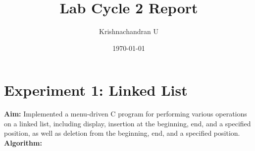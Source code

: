 \documentclass{article}
\title{Lab Cycle 2 Report}
\author{Krishnachandran U}
\date{\today}
\begin{document}
\maketitle

\tableofcontents %

\clearpage
{}
\section{Experiment 1: Linked List}
\textbf{Aim:} Implemented a menu-driven C program for performing various operations on a linked list, including display, insertion at the beginning, end, and a specified position, as well as deletion from the beginning, end, and a specified position.
\\
\textbf{Algorithm:}
\end{document}
